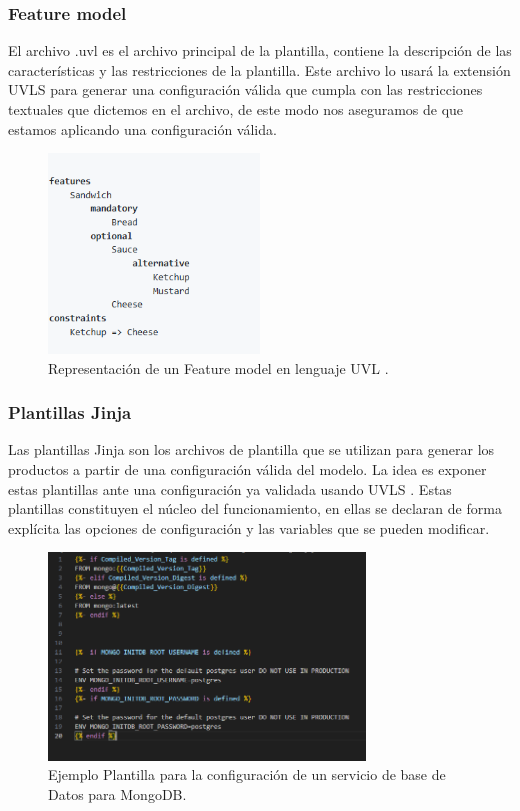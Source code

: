 \documentclass[12pt, a4paper, twoside]{article}
\begin{document}
\subsubsection{Feature model}
El archivo .uvl es el archivo principal de la plantilla, contiene la descripción de las características y las restricciones de la plantilla.
Este archivo lo usará la extensión UVLS \cite{uvls_code} para generar una configuración válida que cumpla con las restricciones textuales que dictemos en el archivo, de este modo nos aseguramos de que estamos aplicando una configuración válida.
\begin{figure}[ht]
	\centering
		\includegraphics[width=0.5\textwidth]{text.feature_model.png}
	\caption{Representación de un Feature model en lenguaje UVL \cite{uvl}.}
\end{figure}

\newpage

\subsubsection{Plantillas Jinja}
Las plantillas Jinja son los archivos de plantilla que se utilizan para generar los productos a partir de una configuración válida del modelo.
La idea es exponer estas plantillas ante una configuración ya validada usando UVLS \cite{uvls_code}. Estas plantillas constituyen el núcleo del funcionamiento, en ellas se declaran de forma explícita las opciones de configuración y las variables que se pueden modificar.

\begin{figure}[h]
	\centering
		\includegraphics[width=0.75\textwidth]{jinja_template_database_mongodb.png}
	\caption{Ejemplo Plantilla para la configuración de un servicio de base de Datos para MongoDB.}
\end{figure}
\end{document}
